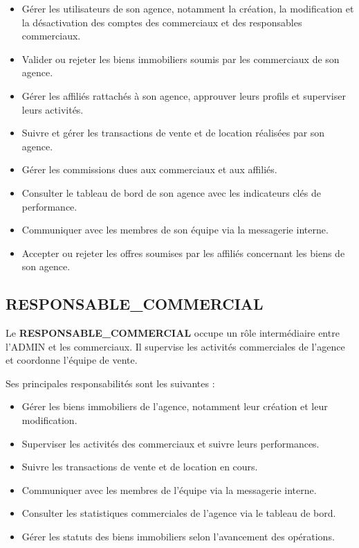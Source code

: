 \documentclass[a4paper,12pt]{report}
\begin{document}
\begin{itemize}
    \item Gérer les utilisateurs de son agence, notamment la création, la modification et la désactivation des comptes des commerciaux et des responsables commerciaux.
    \item Valider ou rejeter les biens immobiliers soumis par les commerciaux de son agence.
    \item Gérer les affiliés rattachés à son agence, approuver leurs profils et superviser leurs activités.
    \item Suivre et gérer les transactions de vente et de location réalisées par son agence.
    \item Gérer les commissions dues aux commerciaux et aux affiliés.
    \item Consulter le tableau de bord de son agence avec les indicateurs clés de performance.
    \item Communiquer avec les membres de son équipe via la messagerie interne.
    \item Accepter ou rejeter les offres soumises par les affiliés concernant les biens de son agence.
\end{itemize}

\subsection{RESPONSABLE\_COMMERCIAL}

Le \textbf{RESPONSABLE\_COMMERCIAL} occupe un rôle intermédiaire entre l'ADMIN et les commerciaux. Il supervise les activités commerciales de l'agence et coordonne l'équipe de vente.

Ses principales responsabilités sont les suivantes :

\begin{itemize}
    \item Gérer les biens immobiliers de l'agence, notamment leur création et leur modification.
    \item Superviser les activités des commerciaux et suivre leurs performances.
    \item Suivre les transactions de vente et de location en cours.
    \item Communiquer avec les membres de l'équipe via la messagerie interne.
    \item Consulter les statistiques commerciales de l'agence via le tableau de bord.
    \item Gérer les statuts des biens immobiliers selon l'avancement des opérations.
\end{itemize}
\end{document}
